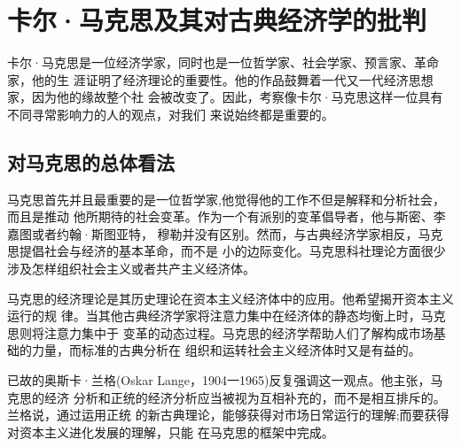 \chapter{卡尔·马克思及其对古典经济学的批判}

卡尔·马克思是一位经济学家，同时也是一位哲学家、社会学家、预言家、革命家，他的生
涯证明了经济理论的重要性。他的作品鼓舞着一代又一代经济思想家，因为他的缘故整个社
会被改变了。因此，考察像卡尔·马克思这样一位具有不同寻常影响力的人的观点，对我们
来说始终都是重要的。

\section{对马克思的总体看法}

马克思首先并且最重要的是一位哲学家,他觉得他的工作不但是解释和分析社会，而且是推动
他所期待的社会变革。作为一个有派别的变革倡导者，他与斯密、李嘉图或者约翰·斯图亚特，
穆勒并没有区别。然而，与古典经济学家相反，马克思提倡社会与经济的基本革命，而不是
小的边际变化。马克思科社理论方面很少涉及怎样组织社会主义或者共产主义经济体。

马克思的经济理论是其历史理论在资本主义经济体中的应用。他希望揭开资本主义运行的规
律。当其他古典经济学家将注意力集中在经济体的静态均衡上时，马克思则将注意力集中于
变革的动态过程。马克思的经济学帮助人们了解构成市场基础的力量，而标准的古典分析在
组织和运转社会主义经济体时又是有益的。

已故的奥斯卡·兰格(Oskar Lange，1904一1965)反复强调这一观点。他主张，马克思的经济
分析和正统的经济分析应当被视为互相补充的，而不是相互排斥的。兰格说，通过运用正统
的新古典理论，能够获得对市场日常运行的理解;而要获得对资本主义进化发展的理解，只能
在马克思的框架中完成。

